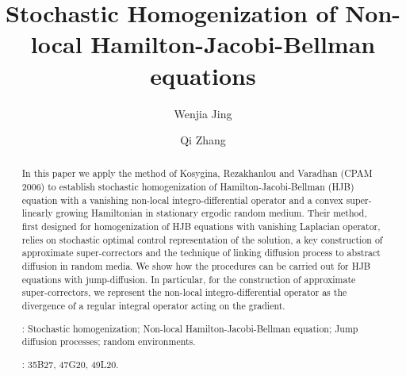 \documentclass[11pt,reqno]{amsart}
\theoremstyle{definition}
\theoremstyle{remark}
\numberwithin{equation}{section}
\begin{document}
\title{Stochastic Homogenization of Non-local Hamilton-Jacobi-Bellman equations}

\author[W. Jing]{Wenjia Jing}
\address[W. Jing]{Yau Mathematical Sciences Center, Tsinghua University, Beijing 100084 and Beijing Institute of Mathematical Sciences and Applications, Beijing 101408, P.R. China}

\author[Q. Zhang]{Qi Zhang}
\address[Q. Zhang]{Beijing Institute of Mathematical Sciences and Applications, Beijing 101408, P.R. China}





\begin{abstract}
        In this paper we apply the method of Kosygina, Rezakhanlou and Varadhan (CPAM 2006) to establish stochastic homogenization of Hamilton-Jacobi-Bellman (HJB) equation with a vanishing non-local integro-differential operator and a convex super-linearly growing Hamiltonian in stationary ergodic random medium. Their method, first designed for homogenization of HJB equations with vanishing Laplacian operator, relies on stochastic optimal control representation of the solution, a key construction of approximate super-correctors and the technique of linking diffusion process to abstract diffusion in random media. We show how the procedures can be carried out for HJB equations with jump-diffusion. In particular, for the construction of approximate super-correctors, we represent the non-local integro-differential operator as the divergence of a regular integral operator acting on the gradient. 

\bigskip
        
        : Stochastic homogenization; Non-local Hamilton-Jacobi-Bellman equation; Jump diffusion processes; random environments.


        \bigskip
        
        : 
35B27, 47G20, 49L20.

\end{abstract}


\maketitle
\end{document}
